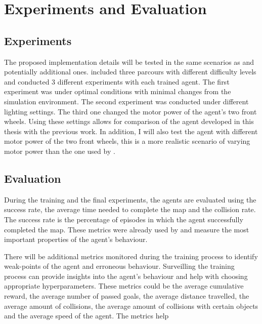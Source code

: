 \chapter{Experiments and Evaluation}
\label{cha:Experiments and Evaluation}

\section{Experiments}

The proposed implementation details will be tested in the same scenarios as \autocite{maximilian} and potentially additional ones. \autocite{maximilian} included three parcours with different difficulty levels and conducted 3 different experiments with each trained agent. The first experiment was under optimal conditions with minimal changes from the simulation environment. The second experiment was conducted under different lighting settings. The third one changed the motor power of the agent's two front wheels. Using these settings allows for comparison of the agent developed in this thesis with the previous work.
In addition, I will also test the agent with different motor power of the two front wheels, this is a more realistic scenario of varying motor power than the one used by \autocite{maximilian}.

\section{Evaluation}

During the training and the final experiments, the agents are evaluated using the success rate, the average time needed to complete the map and the collision rate. The success rate is the percentage of episodes in which the agent successfully completed the map. These metrics were already used by \autocite{maximilian} and measure the most important properties of the agent's behaviour.

There will be additional metrics monitored during the training process to identify weak-points of the agent and erroneous behaviour. Surveilling the training process can provide insights into the agent's behaviour and help with choosing appropriate hyperparameters.
These metrics could be the average cumulative reward, the average number of passed goals, the average distance travelled, the average amount of collisions, the average amount of collisions with certain objects and the average speed of the agent.
The metrics help 